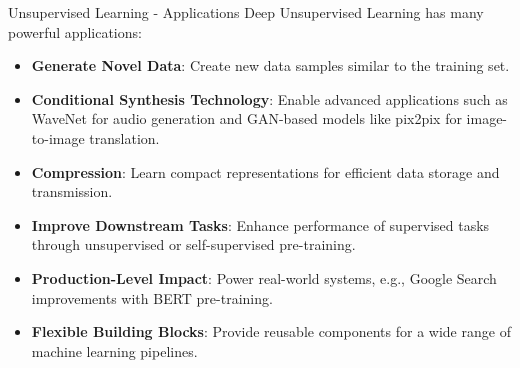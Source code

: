 \begin{frame}[allowframebreaks]{Unsupervised Learning - Applications}
    Deep Unsupervised Learning has many powerful applications:
    \begin{itemize}
        \item \textbf{Generate Novel Data}: Create new data samples similar to the training set.
        \item \textbf{Conditional Synthesis Technology}: Enable advanced applications such as WaveNet for audio generation and GAN-based models like pix2pix for image-to-image translation.
        \item \textbf{Compression}: Learn compact representations for efficient data storage and transmission.
        \item \textbf{Improve Downstream Tasks}: Enhance performance of supervised tasks through unsupervised or self-supervised pre-training.
        \item \textbf{Production-Level Impact}: Power real-world systems, e.g., Google Search improvements with BERT pre-training.
        \item \textbf{Flexible Building Blocks}: Provide reusable components for a wide range of machine learning pipelines.
    \end{itemize}
\end{frame}

